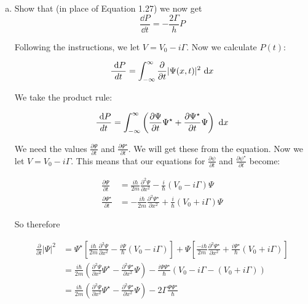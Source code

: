 \documentclass[10pt]{article}
\begin{document}
    \begin{enumerate}[(a)]
        \item Show that (in place of Equation 1.27) we now get
        \[ \frac{\dd P}{\dd t} = -\frac{2\Gamma}{h} P\]
        \begin{solution}
            Following the instructions, we let $V = V_0 - i\Gamma$. Now we calculate $P(t)$:
            
            \[\frac{\ \mathrm d P}{dt} = \int_{-\infty}^{\infty} \frac{\partial}{\partial t} |\Psi(x, t)|^2 \ \mathrm d x\]

            We take the product rule:

            \[ \frac{\ \mathrm d P}{dt} = \int_{-\infty}^{\infty} \left(\frac{\partial \Psi}{\partial t} \Psi^\star + \frac{\partial \Psi^\star}{\partial t} \Psi\right) \ \mathrm d x\]

            We need the values $\frac{\partial \Psi}{\partial t}$ and $\frac{\partial \Psi^\star}{\partial t}$. We will get these from the \schrodinger equation. Now we let $V = V_0 - i\Gamma$. This means that our equations for $\frac{\partial \psi}{\partial t}$ and $\frac{\partial \psi^\star}{\partial t}$ become:

            \begin{align*}
                \frac{\partial \Psi}{\partial t} &= \frac{i\hbar}{2m} \frac{\partial^2\Psi}{\partial x^2} - \frac{i}{\hbar}(V_0 - i\Gamma)\Psi\\
                \frac{\partial \Psi^\star}{\partial t} &= -\frac{i\hbar}{2m} \frac{\partial^2 \Psi^\star}{\partial x^2} + \frac{i}{\hbar}(V_0 + i\Gamma)\Psi
            \end{align*}

            So therefore

            \begin{align*}
                \frac{\partial}{\partial t} |\Psi|^2 &= \Psi^\star\left[\frac{i\hbar}{2m} \frac{\partial^2\Psi}{\partial x^2} - \frac{i\Psi}{\hbar}(V_0 - i\Gamma)\right] + \Psi\left[\frac{-i\hbar}{2m} \frac{\partial^2\Psi^\star}{\partial x^2} + \frac{i\Psi^\star}{\hbar}(V_0 + i\Gamma)\right]\\
                &= \frac{i\hbar}{2m}\left(\frac{\partial^2 \Psi}{\partial x^2} \Psi^\star - \frac{\partial^2\Psi^\star}{\partial x^2}\Psi\right) - \frac{i\Psi\Psi^\star}{\hbar}(V_0 - i\Gamma - (V_0 + i\Gamma))\\
                &= \frac{i\hbar}{2m}\left(\frac{\partial^2 \Psi}{\partial x^2}\Psi^\star - \frac{\partial^2\Psi^\star}{\partial x^2}\Psi\right) - 2\Gamma \frac{\Psi\Psi^\star}{\hbar}
            \end{align*}


\end{solution}
\end{enumerate}
\end{document}
